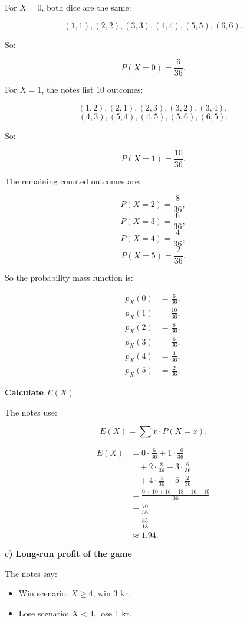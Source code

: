 \documentclass[10pt]{article}
\begin{document}
For \(X=0\), both dice are the same:

\[
(1,1),(2,2),(3,3),
(4,4),(5,5),(6,6).
\]

So:

\[
P(X=0)=\frac{6}{36}.
\]

For \(X=1\), the notes list 10 outcomes:

\[
(1,2),(2,1),(2,3),(3,2),(3,4),
\]
\[
(4,3),(5,4),(4,5),(5,6),(6,5).
\]

So:

\[
P(X=1)=\frac{10}{36}.
\]

The remaining counted outcomes are:

\[
P(X=2)=\frac{8}{36},
\]
\[
P(X=3)=\frac{6}{36},
\]
\[
P(X=4)=\frac{4}{36},
\]
\[
P(X=5)=\frac{2}{36}.
\]

So the probability mass function is:

\begin{align*}
p_X(0)&=\frac{6}{36},\\
p_X(1)&=\frac{10}{36},\\
p_X(2)&=\frac{8}{36},\\
p_X(3)&=\frac{6}{36},\\
p_X(4)&=\frac{4}{36},\\
p_X(5)&=\frac{2}{36}.
\end{align*}

\textbf{Calculate \(E(X)\)}

The notes use:

\[
E(X)=\sum x\cdot P(X=x).
\]

\begin{align*}
E(X)
&=
0\cdot\frac{6}{36}
+1\cdot\frac{10}{36}\\
&\quad
+2\cdot\frac{8}{36}
+3\cdot\frac{6}{36}\\
&\quad
+4\cdot\frac{4}{36}
+5\cdot\frac{2}{36}\\[2mm]
&=
\frac{0+10+16+18+16+10}{36}\\[2mm]
&=
\frac{70}{36}\\[2mm]
&=
\frac{35}{18}\\[2mm]
&\approx
1.94.
\end{align*}

\textbf{c) Long-run profit of the game}

The notes say:

\begin{itemize}
\item
Win scenario: \(X\ge 4\), win 3 kr.
\item
Lose scenario: \(X<4\), lose 1 kr.
\end{itemize}
\end{document}
